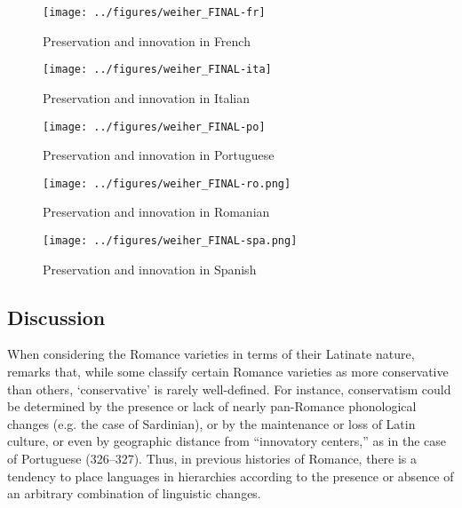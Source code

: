 \documentclass[output=paper,colorlinks,citecolor=brown,
]{langscibook}
\begin{document}
\begin{figure}[h]
    \texttt{[image: ../figures/weiher\_FINAL-fr]}
    \caption{Preservation and innovation in French} 
    \label{fig:weiher:fr}
\end{figure}

\begin{figure}[h]
    \texttt{[image: ../figures/weiher\_FINAL-ita]}
    \caption{Preservation and innovation in Italian} 
    \label{fig:weiher:ita}
\end{figure}

\begin{figure}[h]
    \texttt{[image: ../figures/weiher\_FINAL-po]}
    \caption{Preservation and innovation in Portuguese} 
    \label{fig:weiher:port}
\end{figure}

\begin{figure}[h]
    \texttt{[image: ../figures/weiher\_FINAL-ro.png]}
    \caption{Preservation and innovation in Romanian} 
    \label{fig:weiher:ro}
\end{figure}

\begin{figure}[h]
    \texttt{[image: ../figures/weiher\_FINAL-spa.png]}
    \caption{Preservation and innovation in Spanish} 
    \label{fig:weiher:spa}
\end{figure}

\subsection{Discussion}
When considering the Romance varieties in terms of their Latinate nature, \citet[326]{posner_romance_1996} remarks that, while some classify certain Romance varieties as more conservative than others, ‘conservative’ is rarely well-defined. For instance, conservatism could be determined by the presence or lack of nearly pan-Romance phonological changes (e.g. the case of Sardinian), or by the maintenance or loss of Latin culture, or even by geographic distance from “innovatory centers,” as in the case of Portuguese (326--327). Thus, in previous histories of Romance, there is a tendency to place languages in hierarchies according to the presence or absence of an arbitrary combination of linguistic changes.
\end{document}
